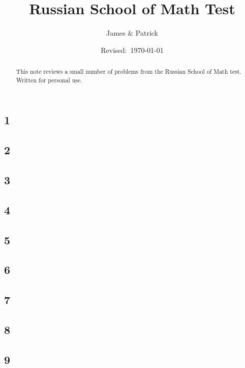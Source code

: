 \documentclass[12pt]{article}
\title{Russian School of Math Test}
\author{James \& Patrick}
\date{Revised:~\today}
\newif\ifsolution\solutionfalse\solutiontrue%
\begin{document}
\maketitle
\begin{abstract}\setlength{\parindent}{0pt}%
This note reviews a small number of problems from the Russian School of Math test. Written for personal use.
\end{abstract}

\thispagestyle{empty}
\clearpage

\subsection*{1}

\ifsolution
  
\fi

\subsection*{2}


\subsection*{3}


\subsection*{4}


\subsection*{5}


\subsection*{6}


\subsection*{7}


\subsection*{8}


\subsection*{9}

\end{document}
